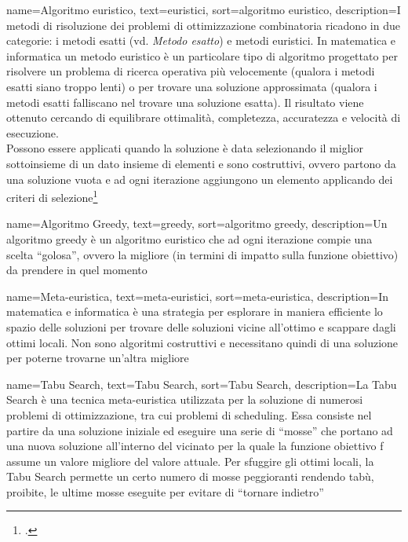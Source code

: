 {
    name=Algoritmo euristico,
    text=euristici,
    sort=algoritmo euristico,
    description={I metodi di risoluzione dei problemi di ottimizzazione combinatoria ricadono in due categorie: i metodi esatti (vd. \textit{Metodo esatto}) e metodi euristici. In matematica e informatica un metodo euristico è un particolare tipo di algoritmo progettato per risolvere un problema di ricerca operativa più velocemente (qualora i metodi esatti siano troppo lenti) o per trovare una soluzione approssimata (qualora i metodi esatti falliscano nel trovare una soluzione esatta). Il risultato viene ottenuto cercando di equilibrare ottimalità, completezza, accuratezza e velocità di esecuzione. \\
    Possono essere applicati quando la soluzione è data selezionando il miglior sottoinsieme di un dato insieme di elementi e sono costruttivi, ovvero partono da una soluzione vuota e ad ogni iterazione aggiungono un elemento applicando dei criteri di selezione\footcite{degio:dispensa}}
}

{
    name=Algoritmo Greedy,
    text=greedy,
    sort=algoritmo greedy,
    description={Un algoritmo greedy è un algoritmo euristico che ad ogni iterazione compie una scelta ``golosa'', ovvero la migliore (in termini di impatto sulla funzione obiettivo) da prendere in quel momento}
}

{
    name=Meta-euristica,
    text=meta-euristici,
    sort=meta-euristica,
    description={In matematica e informatica è una strategia per esplorare in maniera efficiente lo spazio delle soluzioni per trovare delle soluzioni vicine all'ottimo e scappare dagli ottimi locali. Non sono algoritmi costruttivi e necessitano quindi di una soluzione per poterne trovarne un'altra migliore}
}

{
    name=Tabu Search,
    text=Tabu Search,
    sort=Tabu Search,
    description={La Tabu Search è una tecnica meta-euristica utilizzata per la soluzione di numerosi problemi di ottimizzazione, tra cui problemi di scheduling. Essa consiste nel partire da una soluzione iniziale ed eseguire una serie di ``mosse'' che portano ad una nuova soluzione all'interno del vicinato per la quale la funzione obiettivo f assume un valore migliore del valore attuale. Per sfuggire gli ottimi locali, la Tabu Search permette un certo numero di mosse peggioranti rendendo tabù, proibite, le ultime mosse eseguite per evitare di ``tornare indietro''}
}

